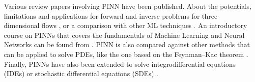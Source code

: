 \documentclass[pdflatex,sn-basic]{sn-jnl}%
\theoremstyle{thmstyleone}%
\theoremstyle{thmstyletwo}%
\theoremstyle{thmstylethree}%
\begin{document}
Various review papers involving PINN have been published.
About the potentials, limitations and applications for forward and inverse problems  \citep{Kar2021_PhysicsInformedMachine_KevKKL}
for three-dimensional flows \citep{Cai2021_PhysicsInformedNeural_MaoCMW},
or a comparison with other ML techniques \citep{Ble2021_ThreeWaysSolve_ErnBE}. %
%
An introductory course on PINNs that covers the fundamentals of Machine Learning and Neural Networks can be found from \cite{Kol2021_PhysicsInformedNeural_DAKDJH}.
%
PINN is also compared against other methods that can be applied to solve PDEs, like the one based on the Feynman–Kac theorem \citep{Ble2021_ThreeWaysSolve_ErnBE}.
%
Finally, PINNs have also been extended to solve integrodifferential equations (IDEs)\citep{Pan2019_FpinnsFractionalPhysics_LuPLK, Yua2022_PinnAuxiliaryPhysics_NiYNDH} or stochastic differential equations (SDEs) \citep{Yan2020_PhysicsInformedGenerative_ZhaYZK}. %

%
%
%
%
\end{document}
